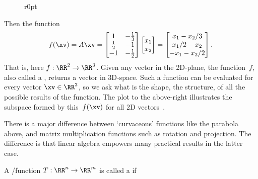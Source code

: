 \begin{wrapfigure}[7]r{0pt}
\end{wrapfigure}
Then the function
\begin{equation*}
f(\xv)=A\xv
=\begin{bmatrix} 1&-\frac13\\\frac12&-1\\-1&-\frac12 \end{bmatrix}\begin{bmatrix} x_1\\x_2 \end{bmatrix}
=\begin{bmatrix} x_1-x_2/3\\x_1/2-x_2\\-x_1-x_2/2 \end{bmatrix}.
\end{equation*}
That is, here \(f:\RR^2\to\RR^3\).  
Given any vector in the 2D-plane, the function~\(f\), also called a , returns a vector in 3D-space.  
Such a function can be evaluated for every vector \(\xv\in\RR^2\), so we ask what is the shape, the structure, of all the possible results of the function.
The plot to the above-right illustrates the subspace formed by this~\(f(\xv)\) for all 2D vectors~\xv.


There is a major difference between `curvaceous' functions like the parabola above, and matrix multiplication functions such as rotation and projection.
The difference is that linear algebra empowers many practical results in the latter case.



\begin{definition} \label{def:lintran} 
A \slash function \(T:\RR^n\to\RR^m\) is called a  if
\end{definition}



